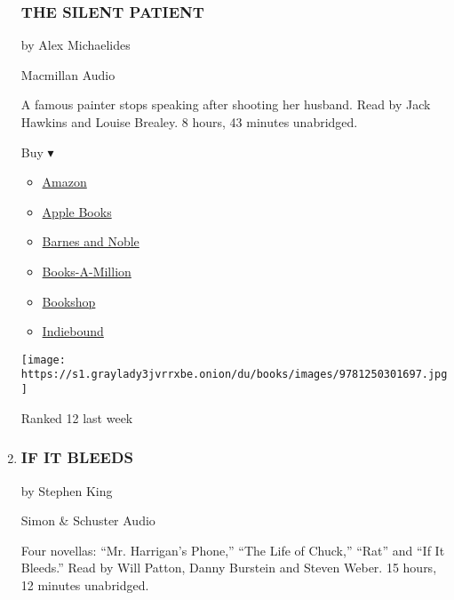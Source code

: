 \begin{enumerate}
{  \subsubsection{THE SILENT PATIENT}\label{the-silent-patient}}

  by Alex Michaelides

  Macmillan Audio

  A famous painter stops speaking after shooting her husband. Read by
  Jack Hawkins and Louise Brealey. 8 hours, 43 minutes unabridged.

  Buy ▾

  \begin{itemize}
  \tightlist
  \item
    \href{https://www.amazon.com/Silent-Patient-Alex-Michaelides/dp/1250301696?tag=NYTBS-20}{Amazon}
  \item
    \href{https://du-gae-books-dot-nyt-du-prd.appspot.com/buy?title=THE+SILENT+PATIENT\&author=Alex+Michaelides}{Apple
    Books}
  \item
    \href{https://www.anrdoezrs.net/click-7990613-11819508?url=https\%3A\%2F\%2Fwww.barnesandnoble.com\%2Fw\%2F\%3Fean\%3D9781250317537}{Barnes
    and Noble}
  \item
    \href{https://www.anrdoezrs.net/click-7990613-35140?url=https\%3A\%2F\%2Fwww.booksamillion.com\%2Fp\%2FTHE\%2BSILENT\%2BPATIENT\%2FAlex\%2BMichaelides\%2F9781250317537}{Books-A-Million}
  \item
    \href{https://bookshop.org/a/3546/9781250317537}{Bookshop}
  \item
    \href{https://www.indiebound.org/book/9781250317537?aff=NYT}{Indiebound}
  \end{itemize}

  \texttt{[image: https://s1.graylady3jvrrxbe.onion/du/books/images/9781250301697.jpg]}

  Ranked 12 last week
\item
  \hypertarget{if-it-bleeds}{%
  \subsubsection{IF IT BLEEDS}\label{if-it-bleeds}}

  by Stephen King

  Simon \& Schuster Audio

  Four novellas: ``Mr. Harrigan's Phone,'' ``The Life of Chuck,''
  ``Rat'' and ``If It Bleeds.'' Read by Will Patton, Danny Burstein and
  Steven Weber. 15 hours, 12 minutes unabridged.


\end{enumerate}
